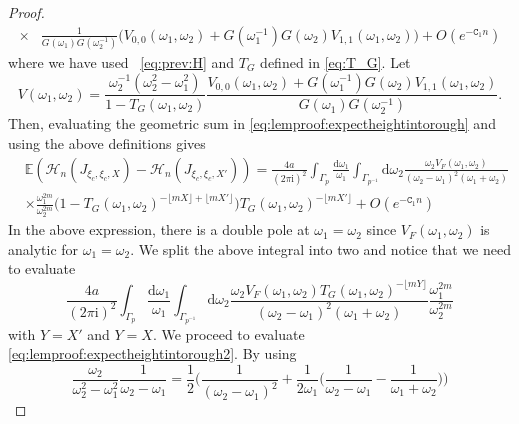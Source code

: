 \documentclass[11pt,twoside]{amsart}
\theoremstyle{plain}
\numberwithin{quest}{section}
\theoremstyle{remark}
\numberwithin{rem}{section}
\theoremstyle{definition}
\begin{document}
{\begin{proof}
\begin{equation}
\begin{split}
					\times &\frac{1}{G(\omega_1)G(\omega_2^{-1})} \bigg( V_{0,0}(\omega_1,\omega_2) +G(\omega_1^{-1})G(\omega_2) V_{1,1}(\omega_1,\omega_2) \bigg)+O(e^{-\mathtt{C}_1n})
				\end{split}
			\end{equation}
			where we have used ~\eqref{eq:prev:H} and $T_G$ defined in \eqref{eq:T_G}. 
			Let 
			\begin{equation*}
				V(\omega_1,\omega_2)=\frac{\omega_2^{-1} (\omega_2^2-\omega_1^2)}{1-T_G(\omega_1,\omega_2)} \frac{ V_{0,0}(\omega_1,\omega_2) +G(\omega_1^{-1})G(\omega_2) V_{1,1}(\omega_1,\omega_2)}{G(\omega_1)G(\omega_2^{-1})}.
			\end{equation*}
			Then, evaluating the geometric sum in \eqref{eq:lemproof:expectheightintorough} and  using the above definitions gives 
			\begin{equation*}
				\begin{split}
					&\mathbb{E}(\mathcal{H}_n(J_{\xi_c,\xi_c,X})-\mathcal{H}_n(J_{\xi_c,\xi_c,X'}))=\frac{4a}{(2\pi \mathrm{i})^2}  \int_{\Gamma_p}\frac{\mathrm{d} \omega_1}{\omega_1} \int_{\Gamma_{p^{-1}}} \mathrm{d}\omega_2 \frac{\omega_2V_F(\omega_1,\omega_2)}{(\omega_2-\omega_1)^2(\omega_1+\omega_2)} \\
					&\times  \frac{\omega_1^{2m}}{\omega_2^{2m}}\big(1-T_G(\omega_1,\omega_2)^{-\lfloor mX \rfloor +\lfloor mX' \rfloor}\big)T_G(\omega_1,\omega_2)^{- \lfloor mX' \rfloor}+O(e^{-\mathtt{C}_1n})
				\end{split}
			\end{equation*}
			In the above expression, there is a double pole at $\omega_1=\omega_2$  since $V_F(\omega_1,\omega_2)$ is analytic for $\omega_1=\omega_2$. 
			We split the above integral into two and notice that we need to evaluate
			\begin{equation}\label{eq:lemproof:expectheightintorough2}
				\frac{4a}{(2\pi \mathrm{i})^2}  \int_{\Gamma_p}\frac{\mathrm{d} \omega_1}{\omega_1} \int_{\Gamma_{p^{-1}}} \mathrm{d}\omega_2 \frac{\omega_2V_F(\omega_1,\omega_2)T_G(\omega_1,\omega_2)^{-\lfloor mY \rfloor}}{(\omega_2-\omega_1)^2(\omega_1+\omega_2)} \frac{\omega_1^{2m}}{\omega_2^{2m}}
			\end{equation}
			with $Y=X'$ and $Y=X$.  We proceed to evaluate \eqref{eq:lemproof:expectheightintorough2}. 
			By using 
			\begin{equation*}
				\frac{\omega_2}{\omega_2^2-\omega_1^2} \frac{1}{\omega_2-\omega_1}=\frac{1}{2}\bigg( \frac{1}{(\omega_2-\omega_1)^2}+\frac{1}{2\omega_1}\bigg( \frac{1}{\omega_2-\omega_1}-\frac{1}{\omega_1+\omega_2} \bigg)\bigg)

\end{equation*}
\end{proof}}
\end{document}
